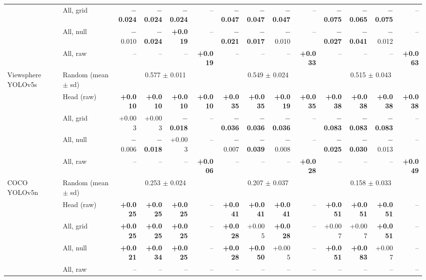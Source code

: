 \begin{tabular}{llrrrrrrrrrrrr}
 & All, grid & \textbf{$-$0.024} & \textbf{$-$0.024} & \textbf{$-$0.024} & -- & \textbf{$-$0.047} & \textbf{$-$0.047} & \textbf{$-$0.047} & -- & \textbf{$-$0.075} & \textbf{$-$0.065} & \textbf{$-$0.075} & -- \\
 & All, null & $-$0.010 & \textbf{$-$0.024} & \textbf{+0.019} & -- & \textbf{$-$0.021} & \textbf{$-$0.017} & $-$0.010 & -- & \textbf{$-$0.027} & \textbf{$-$0.041} & $-$0.012 & -- \\
 & All, raw & -- & -- & -- & \textbf{+0.019} & -- & -- & -- & \textbf{+0.033} & -- & -- & -- & \textbf{+0.063} \\
\midrule
Viewsphere YOLOv5s & Random (mean $\pm$ sd) & \multicolumn{4}{c}{0.577 $\pm$ 0.011} & \multicolumn{4}{c}{0.549 $\pm$ 0.024} & \multicolumn{4}{c}{0.515 $\pm$ 0.043} \\
 & Head (raw) & \textbf{+0.010} & \textbf{+0.010} & \textbf{+0.010} & \textbf{+0.010} & \textbf{+0.035} & \textbf{+0.035} & \textbf{+0.019} & \textbf{+0.035} & \textbf{+0.038} & \textbf{+0.038} & \textbf{+0.038} & \textbf{+0.038} \\
 & All, grid & +0.003 & +0.003 & \textbf{$-$0.018} & -- & \textbf{$-$0.036} & \textbf{$-$0.036} & \textbf{$-$0.036} & -- & \textbf{$-$0.083} & \textbf{$-$0.083} & \textbf{$-$0.083} & -- \\
 & All, null & $-$0.006 & \textbf{$-$0.018} & +0.003 & -- & $-$0.007 & \textbf{$-$0.039} & $-$0.008 & -- & \textbf{$-$0.025} & \textbf{$-$0.030} & $-$0.013 & -- \\
 & All, raw & -- & -- & -- & \textbf{+0.006} & -- & -- & -- & \textbf{+0.028} & -- & -- & -- & \textbf{+0.049} \\
\midrule
COCO YOLOv5n & Random (mean $\pm$ sd) & \multicolumn{4}{c}{0.253 $\pm$ 0.024} & \multicolumn{4}{c}{0.207 $\pm$ 0.037} & \multicolumn{4}{c}{0.158 $\pm$ 0.033} \\
 & Head (raw) & \textbf{+0.025} & \textbf{+0.025} & \textbf{+0.025} & -- & \textbf{+0.041} & \textbf{+0.041} & \textbf{+0.041} & -- & \textbf{+0.051} & \textbf{+0.051} & \textbf{+0.051} & -- \\
 & All, grid & \textbf{+0.025} & \textbf{+0.025} & \textbf{+0.025} & -- & \textbf{+0.028} & +0.005 & \textbf{+0.028} & -- & +0.007 & +0.007 & \textbf{+0.051} & -- \\
 & All, null & \textbf{+0.021} & \textbf{+0.034} & \textbf{+0.025} & -- & \textbf{+0.028} & \textbf{+0.050} & +0.005 & -- & \textbf{+0.051} & \textbf{+0.083} & +0.007 & -- \\
 & All, raw & -- & -- & -- & -- & -- & -- & -- & -- & -- & -- & -- & -- \\

\end{tabular}
